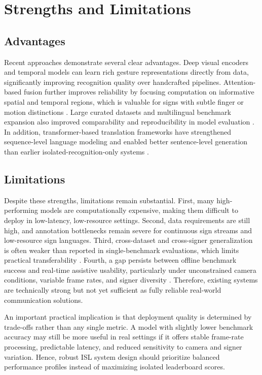 \section{Strengths and Limitations}
\subsection{Advantages}
Recent approaches demonstrate several clear advantages. Deep visual encoders and temporal models can learn rich gesture representations directly from data, significantly improving recognition quality over handcrafted pipelines. Attention-based fusion further improves reliability by focusing computation on informative spatial and temporal regions, which is valuable for signs with subtle finger or motion distinctions \cite{yenisari2025deep,geetha2025toward}. Large curated datasets and multilingual benchmark expansion also improved comparability and reproducibility in model evaluation \cite{joze2019msasl,li2020wlasl,joshi2024isign,kezar2023semlex}. In addition, transformer-based translation frameworks have strengthened sequence-level language modeling and enabled better sentence-level generation than earlier isolated-recognition-only systems \cite{camgoz2020transformers,yin2023gaslt}.

\subsection{Limitations}
Despite these strengths, limitations remain substantial. First, many high-performing models are computationally expensive, making them difficult to deploy in low-latency, low-resource settings. Second, data requirements are still high, and annotation bottlenecks remain severe for continuous sign streams and low-resource sign languages. Third, cross-dataset and cross-signer generalization is often weaker than reported in single-benchmark evaluations, which limits practical transferability \cite{alqurishi2021deep,alabdullah2024advancements}. Fourth, a gap persists between offline benchmark success and real-time assistive usability, particularly under unconstrained camera conditions, variable frame rates, and signer diversity \cite{pandey2025realtime,geetha2025toward}. Therefore, existing systems are technically strong but not yet sufficient as fully reliable real-world communication solutions.

An important practical implication is that deployment quality is determined by trade-offs rather than any single metric. A model with slightly lower benchmark accuracy may still be more useful in real settings if it offers stable frame-rate processing, predictable latency, and reduced sensitivity to camera and signer variation. Hence, robust ISL system design should prioritize balanced performance profiles instead of maximizing isolated leaderboard scores.

